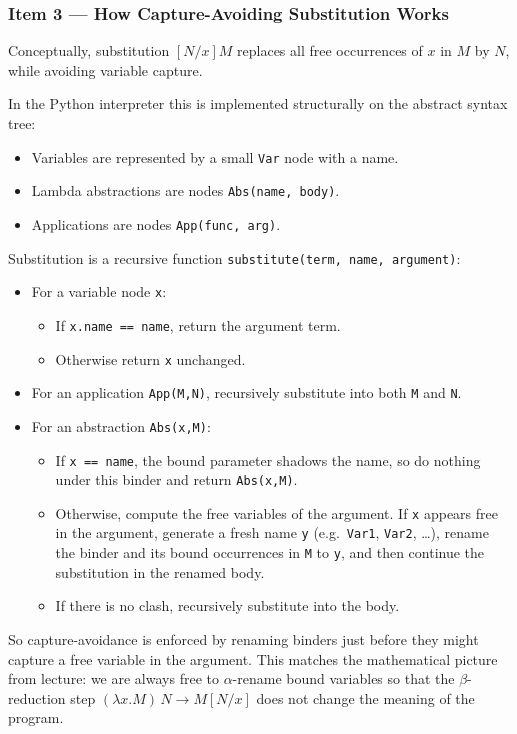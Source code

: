 \documentclass{article}
\theoremstyle{theorem}
\theoremstyle{definition}
\theoremstyle{remark}
\begin{document}
\subsubsection*{Item 3 --- How Capture-Avoiding Substitution Works}
Conceptually, substitution \([N/x]M\) replaces all free occurrences of \(x\) in \(M\) by \(N\), while avoiding variable capture.

In the Python interpreter this is implemented structurally on the abstract syntax tree:
\begin{itemize}
  \item Variables are represented by a small \texttt{Var} node with a name.
  \item Lambda abstractions are nodes \texttt{Abs(name, body)}.
  \item Applications are nodes \texttt{App(func, arg)}.
\end{itemize}
Substitution is a recursive function \texttt{substitute(term, name, argument)}:
\begin{itemize}
  \item For a variable node \texttt{x}:
    \begin{itemize}
      \item If \texttt{x.name == name}, return the argument term.
      \item Otherwise return \texttt{x} unchanged.
    \end{itemize}
  \item For an application \texttt{App(M,N)}, recursively substitute into both \texttt{M} and \texttt{N}.
  \item For an abstraction \texttt{Abs(x,M)}:
    \begin{itemize}
      \item If \texttt{x == name}, the bound parameter shadows the name, so do nothing under this binder and return \texttt{Abs(x,M)}.
      \item Otherwise, compute the free variables of the argument. If \texttt{x} appears free in the argument, generate a fresh name \texttt{y} (e.g.\ \texttt{Var1}, \texttt{Var2}, \dots), rename the binder and its bound occurrences in \texttt{M} to \texttt{y}, and then continue the substitution in the renamed body.
      \item If there is no clash, recursively substitute into the body.
    \end{itemize}
\end{itemize}
So capture-avoidance is enforced by renaming binders just before they might capture a free variable in the argument. This matches the mathematical picture from lecture: we are always free to \(\alpha\)-rename bound variables so that the \(\beta\)-reduction step \( (\lambda x.M)\,N \to M[N/x]\) does not change the meaning of the program.
\end{document}
